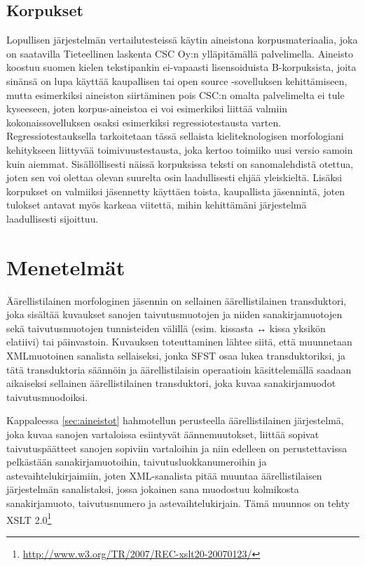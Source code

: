 \documentclass[free]{flammie}
\begin{document}
\subsection{Korpukset}

Lopullisen järjestelmän vertailutesteissä käytin aineistona korpusmateriaalia, joka
on saatavilla Tieteellinen laskenta CSC Oy:n ylläpitämällä palvelimella. Aineisto koostuu suomen kielen tekstipankin ei-vapaasti lisensoiduista B-korpuksista,
joita sinänsä on lupa käyttää kaupallisen tai open source -sovelluksen kehittämiseen, mutta esimerkiksi aineiston siirtäminen pois CSC:n omalta palvelimelta
ei tule kyseeseen, joten korpus-aineistoa ei voi esimerkiksi liittää valmiin kokonaissovelluksen osaksi esimerkiksi regressiotestausta varten. Regressiotestauksella tarkoitetaan tässä sellaista kieliteknologisen morfologiani kehitykseen liittyvää
toimivuustestausta, joka kertoo toimiiko uusi versio samoin kuin aiemmat.
Sisällöllisesti näissä korpuksissa teksti on sanomalehdistä otettua, joten sen voi
olettaa olevan suurelta osin laadullisesti ehjää yleiskieltä. Lisäksi korpukset on
valmiiksi jäsennetty käyttäen toista, kaupallista jäsennintä, joten tulokset antavat
myös karkeaa viitettä, mihin kehittämäni järjestelmä laadullisesti sijoittuu.

\section{Menetelmät}\label{sec:mentelmat}

Äärellistilainen morfologinen jäsennin on sellainen äärellistilainen transduktori,
joka sisältää kuvaukset sanojen taivutusmuotojen ja niiden sanakirjamuotojen sekä taivutusmuotojen tunnisteiden välillä (esim. kissasta ↔ kissa yksikön elatiivi) tai päinvastoin. Kuvauksen toteuttaminen lähtee siitä, että muunnetaan XMLmuotoinen sanalista sellaiseksi, jonka SFST osaa lukea transduktoriksi, ja tätä
transduktoria säännöin ja äärellistilaisin operaatioin käsittelemällä saadaan aikaiseksi sellainen äärellistilainen transduktori, joka kuvaa sanakirjamuodot taivutusmuodoiksi.

Kappaleessa \ref{sec:aineistot} hahmotellun perusteella äärellistilainen järjestelmä, joka kuvaa
sanojen vartaloissa esiintyvät äännemuutokset, liittää sopivat taivutuspäätteet
sanojen sopiviin vartaloihin ja niin edelleen on perustettavissa pelkästään
sanakirjamuotoihin, taivutusluokkanumeroihin ja astevaihtelukirjaimiin, joten
XML-sanalista pitää muuntaa äärellistilaisen järjestelmän sanalistaksi, jossa
jokainen sana muodostuu kolmikosta sanakirjamuoto, taivutusnumero ja
astevaihtelukirjain. Tämä muunnos on tehty XSLT
2.0\footnote{\url{http://www.w3.org/TR/2007/REC-xslt20-20070123/}}
\end{document}
